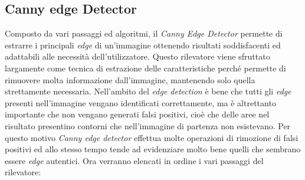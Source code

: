 \subsection {Canny edge Detector}
Composto da vari passaggi ed algoritmi, il \textit{Canny Edge Detector} permette di estrarre i principali \textit{edge} di un'immagine ottenendo risultati soddisfacenti ed adattabili alle necessità dell'utilizzatore.
Questo rilevatore viene sfruttato largamente come tecnica di estrazione delle caratteristiche perché permette di rimuovere molta informazione dall'immagine, mantenendo solo quella strettamente necessaria.
Nell'ambito del \textit{edge detection} è bene che tutti gli \textit{edge} presenti nell'immagine vengano identificati correttamente, ma è altrettanto importante che non vengano generati falsi positivi, cioè che delle aree nel risultato presentino contorni che nell'immagine di partenza non esistevano.
Per questo motivo \textit{Canny edge detector} effettua molte operazioni di rimozione di falsi positivi ed allo stesso tempo tende ad evidenziare molto bene quelli che sembrano essere \textit{edge} autentici.
Ora verranno elencati in ordine i vari passaggi del rilevatore:
